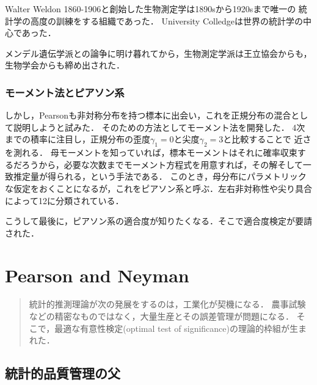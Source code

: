 \documentclass[uplatex,dvipdfmx]{jsreport}
\begin{document}
Walter Weldon 1860-1906と創始した生物測定学は1890sから1920sまで唯一の
統計学の高度の訓練をする組織であった．
University Colledgeは世界の統計学の中心であった．

メンデル遺伝学派との論争に明け暮れてから，生物測定学派は王立協会からも，
生物学会からも締め出された．

\subsection{モーメント法とピアソン系}

しかし，Pearsonも非対称分布を持つ標本に出会い，これを正規分布の混合として説明しようと試みた．
そのための方法としてモーメント法を開発した．
4次までの積率に注目し，正規分布の歪度$\gamma_1=0$と尖度$\gamma_2=3$と比較することで
近さを測れる．
母モーメントを知っていれば，標本モーメントはそれに確率収束するだろうから，必要な次数までモーメント方程式を用意すれば，その解そして一致推定量が得られる，という手法である．
このとき，母分布にパラメトリックな仮定をおくことになるが，これをピアソン系と呼ぶ．左右非対称性や尖り具合によって12に分類されている．

こうして最後に，ピアソン系の適合度が知りたくなる．そこで適合度検定が要請された．

\chapter{Pearson and Neyman}

\begin{quotation}
    統計的推測理論が次の発展をするのは，工業化が契機になる．
    農事試験などの精密なものではなく，大量生産とその誤差管理が問題になる．
    そこで，最適な有意性検定(optimal test of significance)の理論的枠組が生まれた．
\end{quotation}

\section{統計的品質管理の父}
\end{document}
